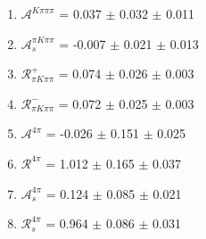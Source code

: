 \begin{enumerate}
\item $\mathcal{A}^{K\pi\pi\pi}$ = 0.037 $\pm$ 0.032 $\pm$ 0.011
\item $\mathcal{A}_s^{\pi K\pi\pi}$ = -0.007 $\pm$ 0.021 $\pm$ 0.013
\item $\mathcal{R}_{\pi K\pi\pi}^+$ = 0.074 $\pm$ 0.026 $\pm$ 0.003
\item $\mathcal{R}_{\pi K\pi\pi}^-$ = 0.072 $\pm$ 0.025 $\pm$ 0.003
\item $\mathcal{A}^{4\pi}$ = -0.026 $\pm$ 0.151 $\pm$ 0.025
\item $\mathcal{R}^{4\pi}$ = 1.012 $\pm$ 0.165 $\pm$ 0.037
\item $\mathcal{A}_s^{4\pi}$ = 0.124 $\pm$ 0.085 $\pm$ 0.021
\item $\mathcal{R}_{s}^{4\pi}$ = 0.964 $\pm$ 0.086 $\pm$ 0.031
\end{enumerate}
